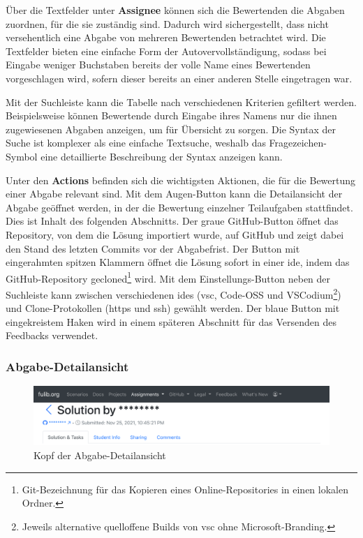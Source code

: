 Über die Textfelder unter \textbf{Assignee} können sich die Bewertenden die Abgaben zuordnen, für die sie zuständig sind.
Dadurch wird sichergestellt, dass nicht versehentlich eine Abgabe von mehreren Bewertenden betrachtet wird.
Die Textfelder bieten eine einfache Form der Autovervollständigung, sodass bei Eingabe weniger Buchstaben bereits der volle Name eines  Bewertenden vorgeschlagen wird, sofern dieser bereits an einer anderen Stelle eingetragen war.

Mit der Suchleiste kann die Tabelle nach verschiedenen Kriterien gefiltert werden.
Beispielsweise können Bewertende durch Eingabe ihres Namens nur die ihnen zugewiesenen Abgaben anzeigen, um für Übersicht zu sorgen.
Die Syntax der Suche ist komplexer als eine einfache Textsuche, weshalb das Fragezeichen-Symbol eine detaillierte Beschreibung der Syntax anzeigen kann.

Unter den \textbf{Actions} befinden sich die wichtigsten Aktionen, die für die Bewertung einer Abgabe relevant sind.
Mit dem Augen-Button kann die Detailansicht der Abgabe geöffnet werden, in der die Bewertung einzelner Teilaufgaben stattfindet.
Dies ist Inhalt des folgenden Abschnitts.
Der graue GitHub-Button öffnet das Repository, von dem die Lösung importiert wurde, auf GitHub und zeigt dabei den Stand des letzten Commits vor der Abgabefrist.
Der Button mit eingerahmten spitzen Klammern öffnet die Lösung sofort in einer \ac{ide}, indem das GitHub-Repository gecloned\footnote{Git-Bezeichnung für das Kopieren eines Online-Repositories in einen lokalen Ordner.} wird.
Mit dem Einstellungs-Button neben der Suchleiste kann zwischen verschiedenen \acp{ide} (\ac{vsc}, Code-OSS und VSCodium\footnote{Jeweils alternative quelloffene Builds von \ac{vsc} ohne Microsoft-Branding.}) und Clone-Protokollen (https und ssh) gewählt werden.
Der blaue Button mit eingekreistem Haken wird in einem späteren Abschnitt für das Versenden des Feedbacks verwendet.

\subsubsection{Abgabe-Detailansicht}

\begin{figure}
    \centering
    \includegraphics[width=\textwidth]{images/solution-head}
    \caption{Kopf der Abgabe-Detailansicht}
    \label{fig:solution-head}
\end{figure}


